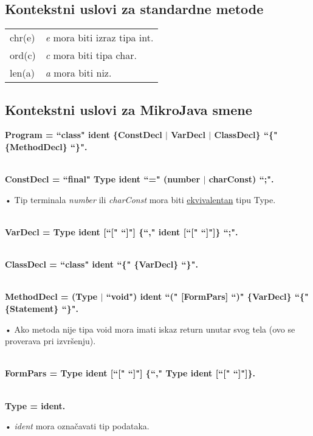 \subsection*{Kontekstni uslovi za standardne metode}

\begin{tabular}{l l}
chr(e) & \textit{e} mora biti izraz tipa int. \\
ord(c) & \textit{c} mora biti tipa char. \\
len(a) & \textit{a} mora biti niz.
\end{tabular}
 
\subsection*{Kontekstni uslovi za MikroJava smene}
 
 
\textbf{Program = ``class" ident \{ConstDecl $\mid$ VarDecl $\mid$ ClassDecl\} ``\{" \{MethodDecl\} ``\}". }

\hRule \\[0.2cm]

\textbf{ConstDecl = ``final" Type ident ``=" (number $\mid$ charConst) ``;".}

• Tip terminala \textit{number} ili \textit{charConst} mora biti \underline{ekvivalentan} tipu Type. 

\hRule \\[0.2cm]
 
\textbf{VarDecl = Type ident [``[" ``]"] \{``," ident [``[" ``]"]\} ``;".} 

\hRule \\[0.2cm]

\textbf{ClassDecl = ``class" ident ``\{" \{VarDecl\} ``\}".} 

\hRule \\[0.2cm]
 
\textbf{MethodDecl = (Type $\mid$ ``void") ident ``(" [FormPars] ``)" \{VarDecl\} ``\{" \{Statement\} ``\}".} 

• Ako metoda nije tipa void mora imati iskaz return unutar svog tela (ovo se proverava pri izvršenju). 

\hRule \\[0.2cm]
 
\textbf{FormPars = Type ident [``["{} ``]"] \{``," Type ident [``["{} ``]"]\}.} 

\hRule \\[0.2cm]

\textbf{Type = ident.} 

• \textit{ident} mora označavati tip podataka. 
 
